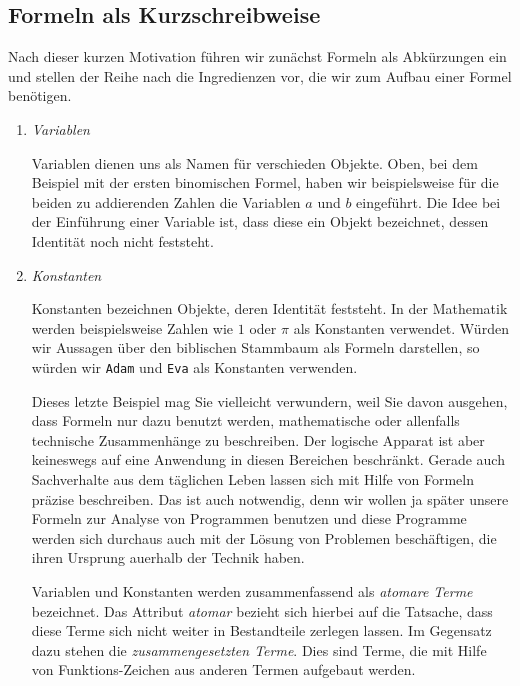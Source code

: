 \subsection{Formeln als Kurzschreibweise}
Nach dieser kurzen Motivation f\"{u}hren wir zun\"{a}chst Formeln als Abk\"{u}rzungen ein und stellen
der Reihe nach die Ingredienzen vor, die wir zum Aufbau einer Formel ben\"{o}tigen. 
\begin{enumerate}
\item \emph{Variablen}

      Variablen dienen uns als Namen f\"{u}r verschieden Objekte.  Oben, bei dem Beispiel mit
      der ersten binomischen Formel, haben wir beispielsweise 
      f\"{u}r die beiden zu addierenden Zahlen die Variablen $a$ und $b$ eingef\"{u}hrt.  Die Idee bei
      der Einf\"{u}hrung einer Variable ist, dass diese ein Objekt bezeichnet, dessen Identit\"{a}t 
      noch nicht feststeht.
\item \emph{Konstanten}

      Konstanten bezeichnen  Objekte, deren Identit\"{a}t feststeht. 
      In der Mathematik werden beispielsweise Zahlen wie $1$ oder $\pi$ als Konstanten verwendet.
      W\"{u}rden wir Aussagen \"{u}ber den biblischen Stammbaum als Formeln darstellen, so w\"{u}rden
      wir  \texttt{Adam} und \texttt{Eva} als Konstanten verwenden.

      \begin{center}
      \begin{minipage}{13.4cm}  
        { \footnotesize
          \setlength{\baselineskip}{9pt} 
          Dieses letzte Beispiel mag Sie vielleicht verwundern, weil Sie davon
          ausgehen, dass Formeln nur dazu benutzt werden, mathematische oder allenfalls
          technische Zusammenh\"{a}nge zu beschreiben.  Der logische Apparat ist aber
          keineswegs auf eine Anwendung in diesen Bereichen beschr\"{a}nkt.  Gerade auch
          Sachverhalte aus dem t\"{a}glichen Leben lassen sich mit Hilfe von Formeln pr\"{a}zise
          beschreiben.  Das ist auch notwendig, denn wir wollen ja sp\"{a}ter unsere Formeln
          zur Analyse von Programmen benutzen und diese Programme werden sich durchaus
          auch mit der L\"{o}sung von Problemen besch\"{a}ftigen, die ihren Ursprung au\3erhalb der
          Technik haben. \par} 
      \end{minipage}
      \end{center}

      Variablen und Konstanten werden zusammenfassend als \emph{atomare Terme}
      bezeichnet.  Das Attribut \emph{atomar} bezieht sich hierbei auf die Tatsache,
      dass diese Terme sich nicht weiter in Bestandteile zerlegen lassen.  Im Gegensatz
      dazu stehen die \emph{zusammengesetzten Terme}.  Dies sind Terme, die mit Hilfe von 
      Funktions-Zeichen aus anderen Termen aufgebaut werden.


\end{enumerate}
